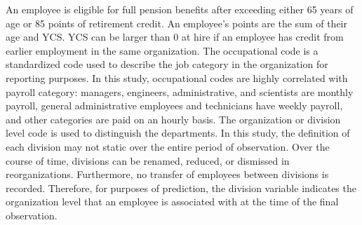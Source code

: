 \documentclass[12pt,letterpaper]{article}
\begin{document}
 An employee is eligible for full pension benefits after exceeding either 65 years of age or 85 points of retirement credit. An employee's points are the sum of their age and YCS.  YCS can be larger than 0 at hire if an employee has credit from earlier employment in the same organization. %
The occupational code is a standardized code used to describe the job category in the organization for reporting purposes. In this study, occupational codes are highly correlated with payroll category: managers, engineers, administrative, and scientists are monthly payroll, general administrative employees and technicians have weekly payroll, and other categories are paid on an hourly basis. The organization or division level code is used to distinguish the departments.  In this study, the definition of each division may not static over the entire period of observation.  Over the course of time, divisions can be renamed, reduced, or dismissed in reorganizations. Furthermore, no transfer of employees between divisions is recorded.  Therefore, for purposes of prediction, the division variable indicates the organization level that an employee is associated with at the time of the final observation.
\end{document}
